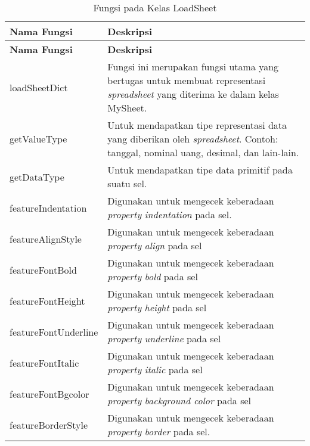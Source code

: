 \begin{small}
\begin{longtable}{ | p{4cm} | p{9cm} | }
    \caption{Fungsi pada Kelas LoadSheet}
    \label{FungsiLoadSheet}\\ \hline
    \centering\bfseries{Nama Fungsi} & \centering\bfseries{Deskripsi} \tabularnewline \hline
    \endfirsthead
    \hline
    \centering\bfseries{Nama Fungsi} & \centering\bfseries{Deskripsi} \tabularnewline \hline
    \endhead
    loadSheetDict & Fungsi ini merupakan fungsi utama yang bertugas untuk membuat representasi \textit{spreadsheet} yang diterima ke dalam kelas MySheet.\\ \hline
    getValueType & Untuk mendapatkan tipe representasi data yang diberikan oleh \textit{spreadsheet}. Contoh: tanggal, nominal uang, desimal, dan lain-lain.\\ \hline
    getDataType & Untuk mendapatkan tipe data primitif pada suatu sel.\\ \hline
    featureIndentation & Digunakan untuk mengecek keberadaan \textit{property} \textit{indentation} pada sel.\\ \hline
    featureAlignStyle & Digunakan untuk mengecek keberadaan \textit{property} \textit{align} pada sel\\ \hline
    featureFontBold & Digunakan untuk mengecek keberadaan \textit{property} \textit{bold} pada sel\\ \hline
    featureFontHeight & Digunakan untuk mengecek keberadaan \textit{property} \textit{height} pada sel\\ \hline
    featureFontUnderline & Digunakan untuk mengecek keberadaan \textit{property} \textit{underline} pada sel\\ \hline
    featureFontItalic & Digunakan untuk mengecek keberadaan \textit{property} \textit{italic} pada sel\\ \hline
    featureFontBgcolor & Digunakan untuk mengecek keberadaan \textit{property} \textit{background color} pada sel\\ \hline
    featureBorderStyle & Digunakan untuk mengecek keberadaan \textit{property} \textit{border} pada sel.\\ \hline
\end{longtable}
\end{small}

